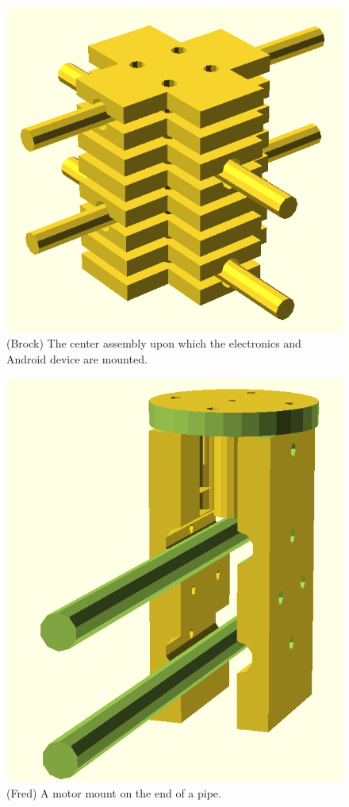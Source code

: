 \begin{figure}[htb]
  \centering
  \includegraphics[scale=0.4]{figures/brock_assembly}
  \caption{(Brock) The center assembly upon which the electronics and
    Android device are mounted.}
  \label{fig:brock}
\end{figure}

\begin{figure}[htb]
  \centering
  \includegraphics[scale=0.4]{figures/fred}
  \caption{(Fred) A motor mount on the end of a pipe.}
  \label{fig:fred}
\end{figure}

